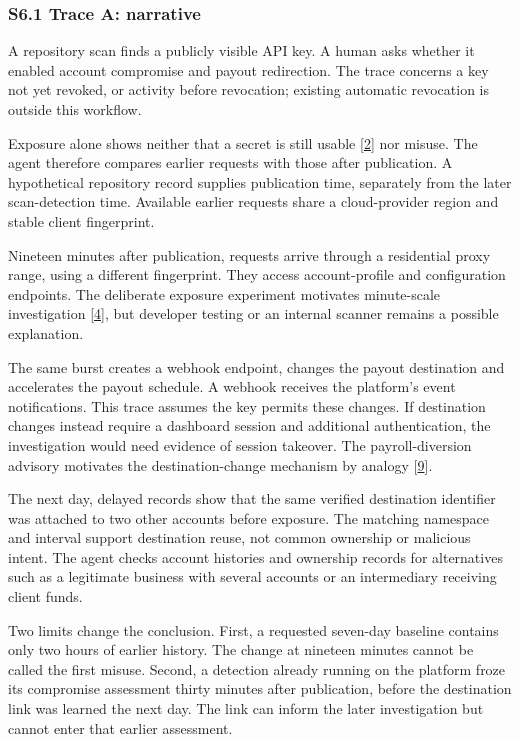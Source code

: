 \documentclass[
  11pt,
]{article}
\begin{document}
\hypertarget{s6.1-trace-a-narrative}{%
\subsubsection{S6.1 Trace A: narrative}\label{s6.1-trace-a-narrative}}

A repository scan finds a publicly visible API key. A human asks whether
it enabled account compromise and payout redirection. The trace concerns
a key not yet revoked, or activity before revocation; existing automatic
revocation is outside this workflow.

Exposure alone shows neither that a secret is still usable
{[}\protect\hyperlink{ref-Meli2019}{2}{]} nor misuse. The agent
therefore compares earlier requests with those after publication. A
hypothetical repository record supplies publication time, separately
from the later scan-detection time. Available earlier requests share a
cloud-provider region and stable client fingerprint.

Nineteen minutes after publication, requests arrive through a
residential proxy range, using a different fingerprint. They access
account-profile and configuration endpoints. The deliberate exposure
experiment motivates minute-scale investigation
{[}\protect\hyperlink{ref-Gamazo2023}{4}{]}, but developer testing or an
internal scanner remains a possible explanation.

The same burst creates a webhook endpoint, changes the payout
destination and accelerates the payout schedule. A webhook receives the
platform's event notifications. This trace assumes the key permits these
changes. If destination changes instead require a dashboard session and
additional authentication, the investigation would need evidence of
session takeover. The payroll-diversion advisory motivates the
destination-change mechanism by analogy
{[}\protect\hyperlink{ref-FBI2018}{9}{]}.

The next day, delayed records show that the same verified destination
identifier was attached to two other accounts before exposure. The
matching namespace and interval support destination reuse, not common
ownership or malicious intent. The agent checks account histories and
ownership records for alternatives such as a legitimate business with
several accounts or an intermediary receiving client funds.

Two limits change the conclusion. First, a requested seven-day baseline
contains only two hours of earlier history. The change at nineteen
minutes cannot be called the first misuse. Second, a detection already
running on the platform froze its compromise assessment thirty minutes
after publication, before the destination link was learned the next day.
The link can inform the later investigation but cannot enter that
earlier assessment.
\end{document}
